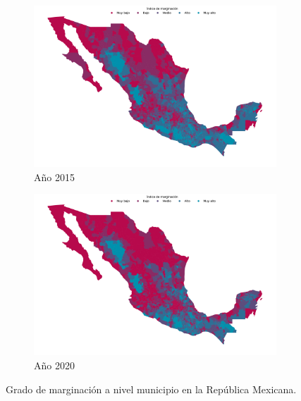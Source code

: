 \begin{figure}[H]
    \centering
    \begin{subfigure}{8.4cm}
        \caption{Año 2015}
        \includegraphics[width=1\linewidth]{Graphics/Data_2015/map.png}
    \end{subfigure}
    \begin{subfigure}{8.4cm}
        \caption{Año 2020}
        \includegraphics[width=1\linewidth]{Graphics/Data_2020/map.png}
    \end{subfigure}
    \caption{Grado de marginación a nivel municipio en la República Mexicana.}
    \label{fig:map_mexico}
\end{figure}